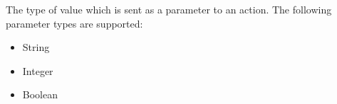 \item[Parameter Type]{
The type of value which is sent as a parameter to an action.
The following parameter types are supported:
\begin{itemize}
\item String
\item Integer
\item Boolean
\end{itemize}
}


